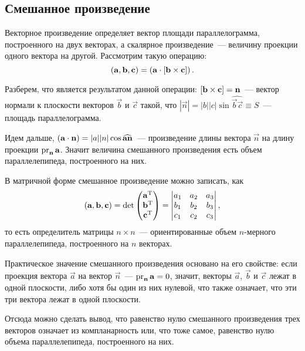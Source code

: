 \subsection{Смешанное произведение}
Векторное произведение определяет вектор площади параллелограмма, построенного на двух векторах, а скалярное произведение~--- величину проекции одного вектора на другой. Рассмотрим такую операцию:
\begin{equation}
	\left( \mathbf{a}, \mathbf{b}, \mathbf{c} \right) = \left(\mathbf{a} \cdot \mathbf{\left[\mathbf{b} \times \mathbf{c}\right]}\right).
\end{equation}

Разберем, что является результатом данной операции: $\left[\mathbf{b} \times \mathbf{c}\right] = \mathbf{n}$~--- вектор нормали к плоскости векторов $\vec{b}$ и $\vec{c}$ такой, что $|\vec{n}| = |b||c| \sin \widehat{\vec{b}\vec{c}} \equiv S$~--- площадь параллелограмма.

Идем дальше, $\left(\mathbf{a} \cdot \mathbf{n}\right) = |a||n|\cos \widehat{\mathbf{a} \mathbf{n}}$~--- произведение длины вектора $\vec{n}$ на длину проекции $\operatorname{pr}_{\mathbf{n}} \mathbf{a}$. Значит величина смешанного произведения есть объем параллелепипеда, построенного на них.

В матричной форме смешанное произведение можно записать, как
\begin{equation}
	\left( \mathbf{a}, \mathbf{b}, \mathbf{c} \right) = \det
	\begin{pmatrix}
		\mathbf{a}^{\operatorname{T}}\\
		\mathbf{b}^{\operatorname{T}}\\
		\mathbf{c}^{\operatorname{T}}
	\end{pmatrix} =
	\begin{vmatrix}
		a_1 & a_2 & a_3\\
		b_1 & b_2 & b_3\\
		c_1 & c_2 & c_3
	\end{vmatrix},
\end{equation}
то есть определитель матрицы $n \times n$~--- ориентированные объем $n$-мерного параллелепипеда, построенного на $n$ векторах.

Практическое значение смешанного произведения основано на его свойстве: если проекция вектора $\vec{a}$ на вектор $\vec{n}$~--- $\operatorname{pr}_{\mathbf{n}} \mathbf{a} = 0$, значит, векторы $\vec{a}$, $\vec{b}$ и $\vec{c}$ лежат в одной плоскости, либо хотя бы один из них нулевой, что также означает, что эти три вектора лежат в одной плоскости.

Отсюда можно сделать вывод, что равенство нулю смешанного произведения трех векторов означает из компланарность или, что тоже самое, равенство нулю объема параллелепипеда, построенного на них.
